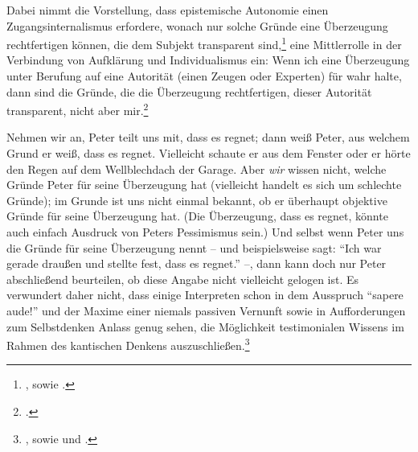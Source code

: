 Dabei nimmt die Vorstellung, dass epistemische Autonomie einen
Zugangsinternalismus erfordere, wonach nur solche Gründe eine Überzeugung
rechtfertigen können, die dem Subjekt transparent
sind,\footnote{\cite[Vgl.][14]{Grundmann:DietraditionelleErkenntnistheorieundihreHerausforderer2001},
sowie \cite[][532]{Grundmann:AnalytischeEinfuehrungindieErkenntnistheorie2008}.}
eine Mittlerrolle in der Verbindung von Aufklärung und Individualismus ein: Wenn
ich eine Überzeugung unter Berufung auf eine Autorität (einen Zeugen oder
Experten) für wahr halte, dann sind die Gründe, die die Überzeugung
rechtfertigen, dieser Autorität transparent, nicht aber
mir.\footnote{\cite[Vgl.][532]{Grundmann:AnalytischeEinfuehrungindieErkenntnistheorie2008}.}


Nehmen wir an, Peter teilt uns mit, dass es regnet; dann weiß Peter, aus welchem
Grund er weiß, dass es regnet. Vielleicht schaute er aus dem Fenster oder er
hörte den Regen auf dem Wellblechdach der Garage. Aber \emph{wir} wissen nicht, welche
Gründe Peter für seine Überzeugung hat (vielleicht handelt es sich um
schlechte Gründe); im Grunde ist uns nicht einmal bekannt, ob er überhaupt
objektive Gründe für seine Überzeugung hat. (Die Überzeugung, dass es regnet,
könnte auch einfach Ausdruck von Peters Pessimismus sein.) Und selbst wenn Peter
uns die Gründe für seine Überzeugung nennt -- und beispielsweise sagt:
\enquote{Ich war gerade draußen und stellte fest, dass es regnet.} --, dann kann
doch nur Peter abschließend beurteilen, ob diese Angabe nicht vielleicht gelogen
ist. Es verwundert daher nicht, dass einige Interpreten schon in dem Ausspruch
\enquote{sapere aude!} und der Maxime einer niemals passiven Vernunft sowie in
Aufforderungen zum Selbstdenken Anlass genug sehen, die Möglichkeit
testimonialen Wissens im Rahmen des kantischen Denkens
auszuschließen.\footnote{\cite[Vgl.~z.\,B.][46]{Schmitt:JustificationSocialityandAutonomy1987},
sowie
\cite{Grundmann:DietraditionelleErkenntnistheorieundihreHerausforderer2001} und
\cite[][529--541]{Grundmann:AnalytischeEinfuehrungindieErkenntnistheorie2008}.}


